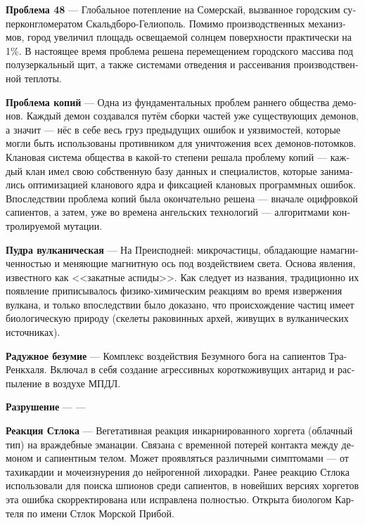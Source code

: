 \documentclass[a4paper,12pt,fleqn]{book}\usepackage{polyglossia}\setdefaultlanguage[babelshorthands=true]{russian}\setotherlanguage{english}\defaultfontfeatures{Ligatures=TeX,Mapping=tex-text}\usepackage{xcolor}\newcommand{\ml}[3]{#2}
\newcommand{\theterm}[3]{\textbf{\hypertarget{#1}{#2}} --- #3}
\begin{document}
{\theterm{problem-48}
{Проблема 48}
{Глобальное потепление на Сомерскай, вызванное городским суперконгломератом Скальдборо-Гелиополь.
Помимо производственных механизмов, город увеличил площадь освещаемой солнцем поверхности практически на 1\%.
В настоящее время проблема решена перемещением городского массива под полузеркальный щит, а также системами отведения и рассеивания производственной теплоты.}

\theterm{copies-problem}
{Проблема копий}
{Одна из фундаментальных проблем раннего общества демонов.
Каждый демон создавался путём сборки частей уже существующих демонов, а значит --- нёс в себе весь груз предыдущих ошибок и уязвимостей, которые могли быть использованы противником для уничтожения всех демонов-потомков.
Клановая система общества в какой-то степени решала проблему копий --- каждый клан имел свою собственную базу данных и специалистов, которые занимались оптимизацией кланового ядра и фиксацией клановых программных ошибок.
Впоследствии проблема копий была окончательно решена --- вначале оцифровкой сапиентов, а затем, уже во времена ангельских технологий --- алгоритмами контролируемой мутации.}

\theterm{volcanic-facepowder}
{Пудра вулканическая}
{На Преисподней: микрочастицы, обладающие намагниченностью и меняющие магнитную ось под воздействием света. 
Основа явления, известного как <<закатные аспиды>>.
Как следует из названия, традиционно их появление приписывалось физико-химическим реакциям во время извержения вулкана, и только впоследствии было доказано, что происхождение частиц имеет биологическую природу (скелеты раковинных архей, живущих в вулканических источниках).}

\theterm{rainbow-madness}
{Радужное безумие}
{Комплекс воздействия Безумного бога на сапиентов Тра-Ренкхаля.
Включал в себя создание агрессивных короткоживущих антарид и распыление в воздухе МПДЛ.}

\theterm{destruction}
{Разрушение}
{---}

\theterm{stlock-reaction}
{Реакция Стлока}
{Вегетативная реакция инкарнированного хоргета (облачный тип) на враждебные эманации.
Связана с временной потерей контакта между демоном и сапиентным телом.
Может проявляться различными симптомами --- от тахикардии и мочеизнурения до нейрогенной лихорадки.
Ранее реакцию Стлока использовали для поиска шпионов среди сапиентов, в новейших версиях хоргетов эта ошибка скорректирована или исправлена полностью.
Открыта биологом Картеля по имени Стлок Морской Прибой.}

}
\end{document}
